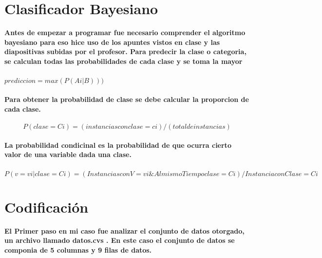 \documentclass[10pt,a4paper]{article}
\begin{document}
\printindex

\section{
Clasificador Bayesiano
}
\paragraph{Antes de empezar a programar fue necesario comprender el algoritmo bayesiano para eso hice uso de los apuntes vistos en clase y las diapositivas subidas por el profesor.
Para predecir la clase o categoria, se calculan todas las probabilidades de cada clase y se toma la mayor}

\paragraph{$prediccion=max(P(Ai|B)))$}

\paragraph{ Para obtener la probabilidad de clase se debe calcular la proporcion de cada clase.}

\paragraph{$$P(clase=Ci)= (instancias con clase = ci)/(total de instancias)$$}

\paragraph{La probabilidad condicinal es la probabilidad de que ocurra cierto valor de una variable dada una clase.}

\paragraph{$P(v=vi|clase=Ci)=(Instanciascon V=vi \& AlmismoTiempo clase = Ci)/InstanciaconClase = Ci$}

\section{
Codificaci\'on
}

\paragraph{El Primer paso en mi caso fue analizar el conjunto de datos otorgado, un archivo llamado datos.cvs . En este caso el conjunto de datos se componia de 5 columnas y 9 filas de datos.}
\end{document}
